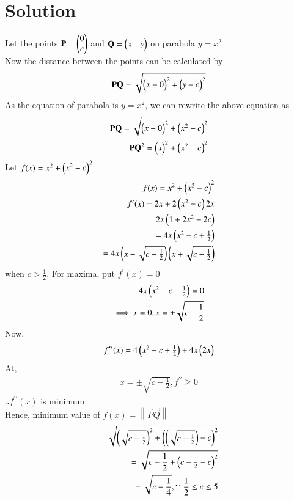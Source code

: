 \documentclass[journal,12pt,twocolumn]{IEEEtran}
\newcommand{\norm}[1]{\left\lVert#1\right\rVert}
\begin{document}
\section{Solution}
Let the points $\mathbf{P} =\begin{pmatrix}0\\c\end{pmatrix}$ and $\mathbf{Q} =\begin{pmatrix}x&y\end{pmatrix}$ on parabola $y=x^2$
\\Now the distance between the points can be calculated by
\begin{align}
  \mathbf{P}\mathbf{Q}=\sqrt{\begin{pmatrix}x-0\end{pmatrix}^2+\begin{pmatrix}y-c\end{pmatrix}^2} 
\end{align}
As the equation of parabola is $y=x^2$, we can rewrite the above equation as
 \begin{align}
      \mathbf{P}\mathbf{Q}=\sqrt{\begin{pmatrix}x-0\end{pmatrix}^2+\begin{pmatrix}x^2-c\end{pmatrix}^2}\\
      \mathbf{P}\mathbf{Q}^2=\begin{pmatrix}x\end{pmatrix}^2+\begin{pmatrix}x^2-c\end{pmatrix}^2
 \end{align}
Let $f(x) = x^2+\begin{pmatrix}x^2-c\end{pmatrix}^2$ 
\begin{align}
    f(x) = x^2+\begin{pmatrix}x^2-c\end{pmatrix}^2\\
    f^\prime(x)=2x+2\begin{pmatrix}x^2-c\end{pmatrix}2x\\
    =2x\begin{pmatrix}1+2x^2-2c\end{pmatrix}\\
     =4x\begin{pmatrix}x^2-c+\frac{1}{2}\end{pmatrix}\\
     =4x\begin{pmatrix}x-\sqrt{c-\frac{1}{2}}\end{pmatrix}\begin{pmatrix}x+\sqrt{c-\frac{1}{2}}\end{pmatrix}
\end{align}
when $c>\frac{1}{2}$,
For maxima, put $f^\prime(x)=0$
\begin{align}
   4x\begin{pmatrix}x^2-c+\frac{1}{2}\end{pmatrix}=0 \\
   \implies x=0, x=\pm \sqrt{c-\frac{1}{2}}
\end{align}
Now,
\begin{align}
   f^{\prime\prime}(x)=4\begin{pmatrix}x^2-c+\frac{1}{2}\end{pmatrix}+4x\begin{pmatrix}2x\end{pmatrix}
\end{align}
At,
\begin{align}
    x =\pm \sqrt{c-\frac{1}{2}} , f^{\prime\prime}\geq 0
\end{align}
$\therefore f^{\prime\prime}(x)$ is minimum\\
Hence, minimum value of $f(x)=\norm{\vec{P}\vec{Q}}$
\begin{align}
   = \sqrt{\begin{pmatrix}\sqrt{c-\frac{1}{2}}\end{pmatrix}^2+\begin{pmatrix}\begin{pmatrix}\sqrt{c-\frac{1}{2}}\end{pmatrix}-c\end{pmatrix}^2}\\
   = \sqrt{c-\frac{1}{2}+\begin{pmatrix}c-\frac{1}{2}-c\end{pmatrix}^2}\\
    =\sqrt{c-\frac{1}{4}} , \because \frac{1}{2}\leq c \leq 5 
    \end{align}
\end{document}
